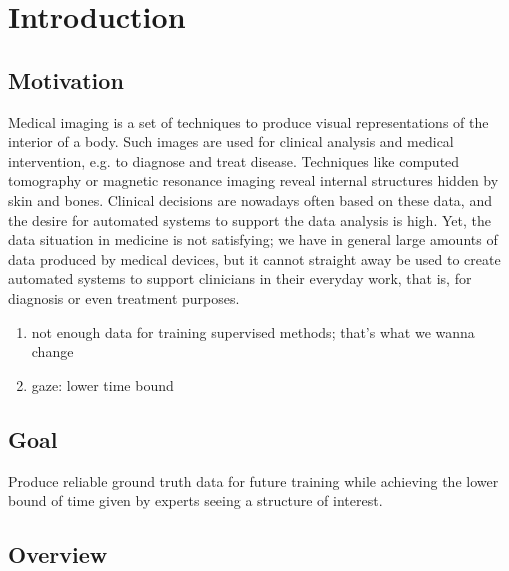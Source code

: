\chapter{Introduction}
\label{chap:introduction}

\section{Motivation}
      Medical imaging is a set of techniques to produce visual representations of the interior of a body. 
      Such images are used for clinical analysis and medical intervention, e.g. to diagnose and treat disease. 
      Techniques like computed tomography or magnetic resonance imaging reveal internal structures hidden by skin and bones. 
      Clinical decisions are nowadays often based on these data, and the desire for automated systems to support the data analysis is high. 
      Yet, the data situation in medicine is not satisfying; we have in general large amounts of data produced by medical devices, but it cannot straight away be used to create automated systems to support clinicians in their everyday work, that is, for diagnosis or even treatment purposes. 

    \begin{enumerate}
      \item not enough data for training supervised methods; that's what we wanna change
      \item gaze: lower time bound
    \end{enumerate}
  
  
\section{Goal}
Produce reliable ground truth data for future training while achieving the lower bound of time given by experts seeing a structure of interest.

\section{Overview}